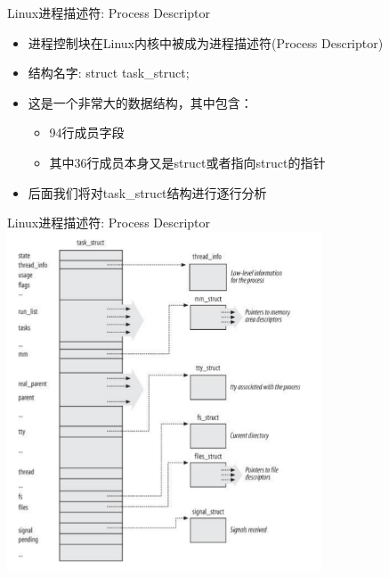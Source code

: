 \documentclass[xcolor=svgnames]{beamer}
\begin{document}
\begin{CJK*}{UTF8}{gbsn}
\begin{frame}{Linux进程描述符: Process Descriptor}
\begin{itemize}
\item 进程控制块在Linux内核中被成为进程描述符(Process Descriptor)
\item 结构名字: struct task\_struct;
\item 这是一个非常大的数据结构，其中包含：
\begin{itemize}
\item 94行成员字段
\item 其中36行成员本身又是struct或者指向struct的指针
\end{itemize}
\item 后面我们将对task\_struct结构进行逐行分析
\end{itemize}
\end{frame}

\begin{frame}{Linux进程描述符: Process Descriptor}
\includegraphics[width=0.7\textwidth]{taskstruct.png}
\end{frame}


\end{CJK*}
\end{document}
